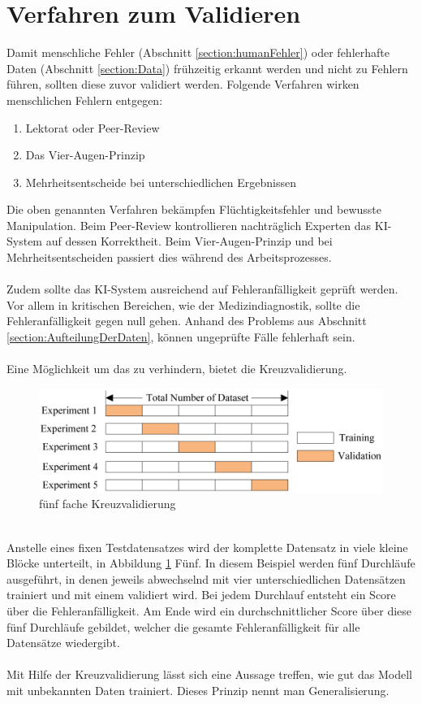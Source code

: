 \documentclass[12pt,oneside,a4paper,parskip]{scrbook}
\begin{document}
\section{Verfahren zum Validieren}
\label{section:validate}

Damit menschliche Fehler (Abschnitt \ref{section:humanFehler}) oder fehlerhafte Daten (Abschnitt \ref{section:Data}) frühzeitig erkannt werden und nicht zu Fehlern führen, sollten diese zuvor validiert werden. Folgende Verfahren wirken menschlichen Fehlern entgegen:
\begin{enumerate}
	\item Lektorat oder Peer-Review
	\item Das Vier-Augen-Prinzip
	\item Mehrheitsentscheide bei unterschiedlichen Ergebnissen
\end{enumerate}
Die oben genannten Verfahren bekämpfen Flüchtigkeitsfehler und bewusste Manipulation. Beim Peer-Review kontrollieren nachträglich Experten das KI-System auf dessen Korrektheit. Beim Vier-Augen-Prinzip und bei Mehrheitsentscheiden passiert dies während des Arbeitsprozesses. 
\\\\
Zudem sollte das KI-System ausreichend auf Fehleranfälligkeit geprüft werden. Vor allem in kritischen Bereichen, wie der Medizindiagnostik, sollte die Fehleranfälligkeit gegen null gehen. Anhand des Problems aus Abschnitt \ref{section:AufteilungDerDaten}, können ungeprüfte Fälle fehlerhaft sein.
\\\\
Eine Möglichkeit um das zu verhindern, bietet die Kreuzvalidierung. 
\begin{figure}[h]
	\begin{center}
		\includegraphics[width=15cm]{Bilder/crossValidierung.png}
		\caption{fünf fache Kreuzvalidierung}
		\label{fig:crossValidierung}
	\end{center}
\end{figure}

\\Anstelle eines fixen Testdatensatzes wird der komplette Datensatz in viele kleine Blöcke unterteilt, in Abbildung \ref{fig:crossValidierung} Fünf. In diesem Beispiel werden fünf Durchläufe ausgeführt, in denen jeweils abwechselnd mit vier unterschiedlichen Datensätzen trainiert und mit einem validiert wird. Bei jedem Durchlauf entsteht ein Score über die Fehleranfälligkeit. Am Ende wird ein durchschnittlicher Score über diese fünf Durchläufe gebildet, welcher die gesamte Fehleranfälligkeit für alle Datensätze wiedergibt.
\\\\
Mit Hilfe der Kreuzvalidierung lässt sich eine Aussage treffen, wie gut das Modell mit unbekannten Daten trainiert. Dieses Prinzip nennt man Generalisierung.
\end{document}
